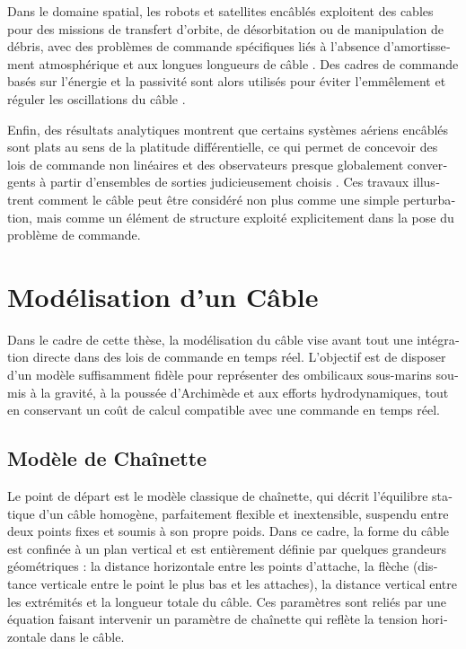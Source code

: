\begin{otherlanguage}{french}
	Dans le domaine spatial, les robots et satellites encâblés exploitent des cables pour des missions
	de transfert d'orbite, de désorbitation ou de manipulation de débris, avec des problèmes de
	commande spécifiques liés à l'absence d'amortissement atmosphérique et aux longues longueurs de
	câble \parencite{modiDeploymentDynamicsTether1979,huangDexterousTetheredSpace2017}. Des cadres de
	commande basés sur l'énergie et la passivité sont alors utilisés pour éviter l'emmêlement et
	réguler les oscillations du câble \parencite{wangAntitangleControlTethered2019}.

	Enfin, des résultats analytiques montrent que certains systèmes aériens encâblés sont plats au sens
	de la platitude différentielle, ce qui permet de concevoir des lois de commande non linéaires et
	des observateurs presque globalement convergents à partir d'ensembles de sorties judicieusement
	choisis \parencite{tognonDynamicsControlEstimation2017}. Ces travaux illustrent comment le câble
	peut être considéré non plus comme une simple perturbation, mais comme un élément de structure
	exploité explicitement dans la pose du problème de commande.

	\section{Modélisation d'un Câble}
	\label{sif_cable_modelling}

	Dans le cadre de cette thèse, la modélisation du câble vise avant tout une intégration directe dans
	des lois de commande en temps réel. L'objectif est de disposer d'un modèle suffisamment fidèle pour
	représenter des ombilicaux sous-marins soumis à la gravité, à la poussée d'Archimède et aux efforts
	hydrodynamiques, tout en conservant un coût de calcul compatible avec une commande en temps réel.

	\subsection{Modèle de Chaînette}

	Le point de départ est le modèle classique de chaînette, qui décrit l'équilibre statique d'un câble
	homogène, parfaitement flexible et inextensible, suspendu entre deux points fixes et soumis à son
	propre poids. Dans ce cadre, la forme du câble est confinée à un plan vertical et est entièrement
	définie par quelques grandeurs géométriques : la distance horizontale entre les points d'attache,
	la flèche (distance verticale entre le point le plus bas et les attaches), la distance vertical
	entre les extrémités et la longueur totale du câble. Ces paramètres sont reliés par une équation
	faisant intervenir un paramètre de chaînette qui reflète la tension horizontale dans le câble.


\end{otherlanguage}

